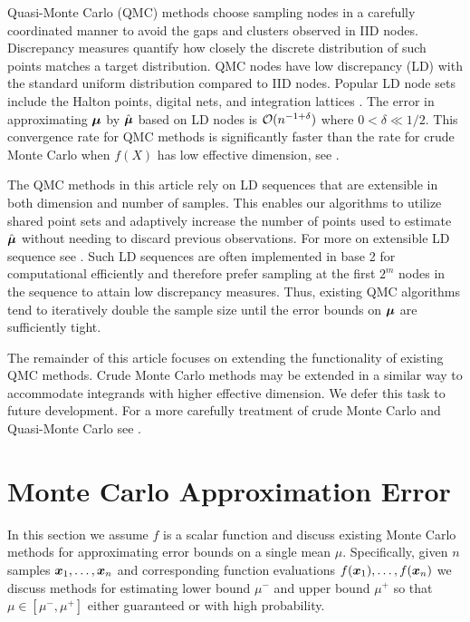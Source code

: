 \documentclass{article}[12pt]
\begin{document}
Quasi-Monte Carlo (QMC) methods choose sampling nodes in a carefully coordinated manner to avoid the gaps and clusters observed in IID nodes.  Discrepancy measures quantify how closely the discrete distribution of such points matches a target distribution. QMC nodes have low discrepancy (LD) with the standard uniform distribution compared to IID nodes. Popular LD node sets include the Halton points, digital nets, and integration lattices . The error in approximating $\boldsymbol{\mu}$ by $\hat{\boldsymbol{\mu}}$ based on LD nodes is  $\mathcal{O}(n^{-1+\delta})$ where $0 < \delta \ll 1/2$. This convergence rate for QMC methods is significantly faster than the rate for crude Monte Carlo when $f(X)$ has low effective dimension, see . 

The QMC methods in this article rely on LD sequences that are extensible in both dimension and number of samples. This enables our algorithms to utilize shared point sets and adaptively increase the number of points used to estimate $\hat{\boldsymbol{\mu}}$ without needing to discard previous observations. For more on extensible LD sequence see . Such LD sequences are often implemented in base 2 for computational efficiently and therefore prefer sampling at the first $2^m$ nodes in the sequence to attain low discrepancy measures. Thus, existing QMC algorithms tend to iteratively  double the sample size until the error bounds on $\boldsymbol{\mu}$ are sufficiently tight. 

The remainder of this article focuses on extending the functionality of existing QMC methods. Crude Monte Carlo methods may be extended in a similar way to accommodate integrands with higher effective dimension. We defer this task to future development.  For a more carefully treatment of crude Monte Carlo and Quasi-Monte Carlo see \cite{mcbook}. 

\section{Monte Carlo Approximation Error}\label{sec:Existing_QMC_Methods}

In this section we assume $f$ is a scalar function and discuss existing Monte Carlo methods for approximating error bounds on a single mean $\mu$. Specifically, given $n$ samples $\boldsymbol{x}_1,\dots,\boldsymbol{x}_n$ and  corresponding function evaluations $f(\boldsymbol{x}_1),\dots,f(\boldsymbol{x}_n)$ we discuss methods for estimating lower bound $\mu^-$ and upper bound $\mu^+$ so that $\mu \in [\mu^-,\mu^+]$ either guaranteed or with high probability. 
\end{document}
